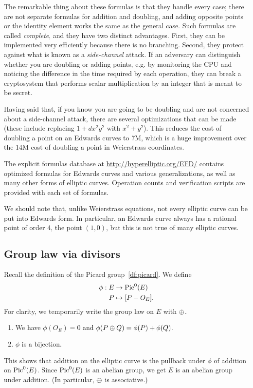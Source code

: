 The remarkable thing about these formulas is that they handle every case; there
are not separate formulas for addition and doubling, and adding opposite points or the identity element works the same as the general case.
Such formulas are called \emph{complete}, and they have two distinct advantages.
First, they can be implemented very efficiently because there is no branching.
Second, they protect against what is known as a \emph{side-channel} attack.  If an adversary can distinguish whether you are doubling or adding points, e.g. by monitoring the CPU and noticing the difference in the time required by each operation, they can break a cryptosystem that performs scalar multiplication by an integer that is meant to be secret.

Having said that, if you know you are going to be doubling and are not concerned about a side-channel attack, there are several optimizations that can be made (these include replacing $1+dx^2y^2$ with $x^2+y^2$).
This reduces the cost of doubling a point on an Edwards curves to 7M, which is a huge improvement over the 14M cost of doubling a point in Weierstrass coordinates.

The explicit formulas database at \url{http://hyperelliptic.org/EFD/} contains optimized formulas for Edwards curves and various generalizations, as well as many other forms of elliptic curves.  Operation counts and verification scripts are provided with each set of formulas.

We should note that, unlike Weierstrass equations, not every elliptic curve can be put into Edwards form.
In particular, an Edwards curve always has a rational point of order 4, the point $(1,0)$, but this is not true of many elliptic curves.

\subsection{Group law via divisors}

Recall the definition of the Picard group~\ref{df:picard}. 
We define 
\begin{align*}
\phi:E&\to \operatorname{Pic}^0(E)\\
P&\mapsto [P-O_E].
\end{align*}
For clarity, we temporarily write the group law on $E$ with $\oplus$.
\begin{pr}
\begin{enumerate}
\item We have $\phi(O_E)=0$ and 
$\phi(P \oplus Q)=\phi(P)+\phi(Q)$.
\item
$\phi$ is a bijection.
\end{enumerate}
\end{pr}
This shows that addition on the elliptic curve is the pullback under $\phi$ of addition on $\operatorname{Pic}^0(E)$. Since $\operatorname{Pic}^0(E)$ is an abelian group, we get $E$ is an abelian group under addition. (In particular, $\oplus$ is associative.)

